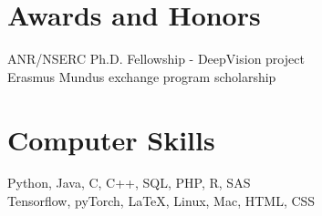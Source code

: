 \documentclass[10pt]{res} %
\begin{document}
\begin{resume}

\section{\large Awards and Honors} 
ANR/NSERC Ph.D. Fellowship - DeepVision project \\
Erasmus Mundus exchange program scholarship


\section{\large Computer Skills} 
Python, Java, C, C++, SQL, PHP, R, SAS \\
Tensorflow, pyTorch, \LaTeX, Linux, Mac, HTML, CSS \\

\end{resume}
\end{document}

